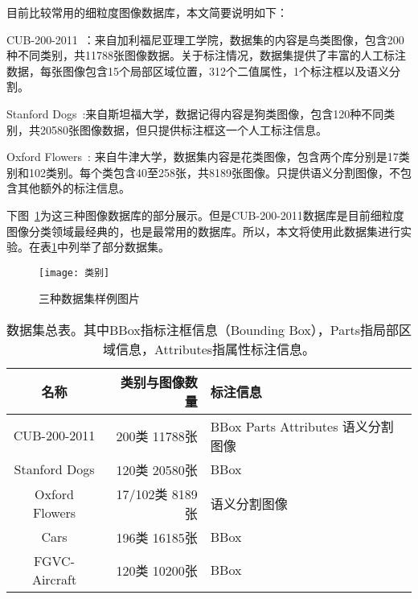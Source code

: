 目前比较常用的细粒度图像数据库，本文简要说明如下：

CUB-200-2011~\cite{WelinderEtal2010}：来自加利福尼亚理工学院，数据集的内容是鸟类图像，包含200种不同类别，共11788张图像数据。关于标注情况，数据集提供了丰富的人工标注数据，每张图像包含15个局部区域位置，312个二值属性，1个标注框以及语义分割。

Stanford Dogs~\cite{KhoslaYaoJayadevaprakashFeiFei_FGVC2011}:来自斯坦福大学，数据记得内容是狗类图像，包含120种不同类别，共20580张图像数据，但只提供标注框这一个人工标注信息。

Oxford Flowers~\cite{nilsback2008automated}: 来自牛津大学，数据集内容是花类图像，包含两个库分别是17类别和102类别。每个类包含40至258张，共8189张图像。只提供语义分割图像，不包含其他额外的标注信息。

下图~\ref{fig:yangli}为这三种图像数据库的部分展示。但是CUB-200-2011数据库是目前细粒度图像分类领域最经典的，也是最常用的数据库。所以，本文将使用此数据集进行实验。在表\ref{tab:shujuji}中列举了部分数据集。
\begin{figure}[H] %
  \centering
  \texttt{[image: 类别]}
  \caption{三种数据集样例图片}
  \label{fig:yangli}
\end{figure}

\begin{table}[H]
  \caption[数据集总表]{数据集总表。其中BBox指标注框信息（Bounding Box），Parts指局部区域信息，Attributes指属性标注信息。}
  \label{tab:shujuji}
   \begin{tabularx}{\linewidth}{c|rl}
     \toprule[1.5pt]
      名称 & 类别与图像数量 &  标注信息 \\
     \hline
      CUB-200-2011  & 200类  11788张 & BBox Parts Attributes 语义分割图像\\ \hline
      Stanford Dogs & 120类  20580张 & BBox\\ \hline
      Oxford Flowers & 17/102类  8189张 & 语义分割图像\\ \hline
      Cars & 196类 16185张  & BBox\\ \hline
      FGVC-Aircraft & 120类 10200张 & BBox\\
      \bottomrule[1.5pt]
    \end{tabularx}
\end{table}














